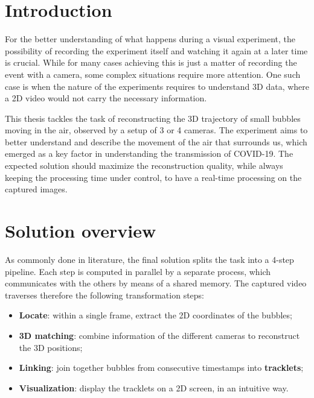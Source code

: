 \newcommand{\summarysection}[1]{\vspace{-.25cm}\section*{#1}\vspace{-.25cm}}

\summarysection{Introduction}

For the better understanding of what happens during a visual experiment, the possibility of recording the experiment itself and watching it again at a later time is crucial.
While for many cases achieving this is just a matter of recording the event with a camera, some complex situations require more attention.
One such case is when the nature of the experiments requires to understand 3D data, where a 2D video would not carry the necessary information.

This thesis tackles the task of reconstructing the 3D trajectory of small bubbles moving in the air, observed by a setup of 3 or 4 cameras.
The experiment aims to better understand and describe the movement of the air that surrounds us, which emerged as a key factor in understanding the transmission of COVID-19.
The expected solution should maximize the reconstruction quality, while always keeping the processing time under control, to have a real-time processing on the captured images.

\summarysection{Solution overview}

As commonly done in literature, the final solution splits the task into a 4-step pipeline.
Each step is computed in parallel by a separate process, which communicates with the others by means of a shared memory.
The captured video traverses therefore the following transformation steps:
\begin{itemize}
	\itemsep 0em
	\item \textbf{Locate}: within a single frame, extract the 2D coordinates of the bubbles;
	\item \textbf{3D matching}: combine information of the different cameras to reconstruct the 3D positions;
	\item \textbf{Linking}: join together bubbles from consecutive timestamps into \textbf{tracklets};
	\item \textbf{Visualization}: display the tracklets on a 2D screen, in an intuitive way.
\end{itemize}

